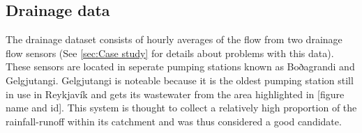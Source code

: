 

\subsection{Drainage data}

The drainage dataset consists of hourly averages of the flow from two drainage flow sensors (See \ref{sec:Case study} for details about problems with this data). These sensors are located in seperate pumping stations known as Boðagrandi and Gelgjutangi. Gelgjutangi is noteable because it is the oldest pumping station still in use in Reykjavík and gets its wastewater from the area highlighted in [figure name and id]. This system is thought to collect a relatively high proportion of the rainfall-runoff within its catchment and was thus considered a good candidate.


